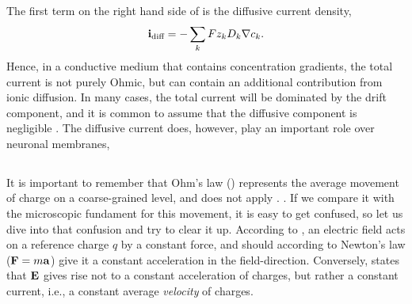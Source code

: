 The first term on the right hand side of  is the diffusive current density, 
\begin{equation}
{\bf i}_\text{diff}  = -\sum_k{F z_k {D_k}{\bf \nabla} c_{k}}.
\label{eq:Basics:idiff}
\end{equation}
Hence, in a conductive medium that contains concentration gradients, the total current is not purely Ohmic, but can contain an additional contribution from ionic diffusion. In many cases, the total current will be dominated by the drift component, and it is common to assume that the diffusive component is negligible . The diffusive current does, however, play an important role over neuronal membranes, 


\subsection{}
\label{sec:Basics:Note} 
It is important to remember that Ohm's law () represents the average movement of charge on a coarse-grained level, and does not apply .
.
 If we compare it with the microscopic fundament for this movement, it is easy to get confused, so let us dive into that confusion and try to clear it up. According to , an electric field acts on a reference charge $q$ by a constant force, and should according to Newton's law (${\bf F} = m{\bf a}$) give it a constant acceleration in the field-direction. Conversely,  states that ${\bf E}$ gives rise not to a constant acceleration of charges, but rather a constant current, i.e., a constant average \textit{velocity} of charges. 


